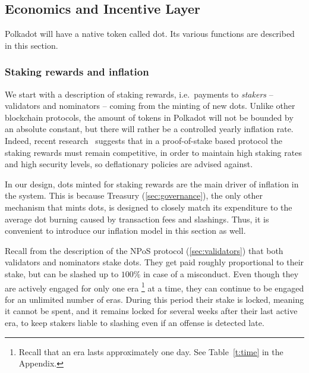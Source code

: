 \subsection{Economics and Incentive Layer}\label{sec:economics}

Polkadot will have a native token called dot. Its various functions are described in this section.



\subsubsection{Staking rewards and inflation}

We start with a description of staking rewards, i.e.~payments to \emph{stakers} -- validators and nominators -- 
coming from the minting of new dots. 
Unlike other blockchain protocols, the amount of tokens in Polkadot will not be bounded by an absolute constant, but there will rather be a controlled yearly inflation rate. Indeed, recent research~\cite{chitra2019competitive} suggests that in a proof-of-stake based protocol the staking rewards must remain competitive, in order to maintain high staking rates and high security levels, so deflationary policies are advised against. 

In our design, dots minted for staking rewards are the main driver of inflation in the system. 
This is because Treasury (\autoref{sec:governance}), the only other mechanism that mints dots, 
is designed to closely match its expenditure to the average dot burning caused by transaction fees and slashings.
Thus, it is convenient to introduce our inflation model in this section as well. 

Recall from the description of the NPoS protocol (\autoref{sec:validators}) that both validators and nominators stake dots. 
They get paid roughly proportional to their stake, but can be slashed up to $100\%$ in case of a misconduct. 
Even though they are actively engaged for only one era%
\footnote{Recall that an era lasts approximately one day. See Table~\ref{t:time} in the Appendix.} 
at a time, they can continue to be engaged for an unlimited number of eras. 
During this period their stake is locked, meaning it cannot be spent, and it remains locked for several weeks after their last active era, to keep stakers liable to slashing even if an offense is detected late.

